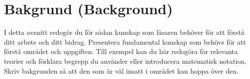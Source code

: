 \section{Bakgrund (Background)}
\label{sec:background}

I detta avsnitt redog\"{o}r du f\"{o}r s\r{a}dan kunskap som l\"{a}saren beh\"{o}ver f\"{o}r att f\"{o}rst\r{a} ditt arbete och ditt bidrag. Presentera fundamental kunskap som beh\"{o}vs f\"{o}r att f\"{o}rst\r{a} omr\r{a}det och uppgiften. Till exempel kan du h\"{a}r redog\"{o}ra f\"{o}r relevanta teorier och f\"{o}rklara begrepp du anv\"{a}nder eller introducera matematisk notation. Skriv bakgrunden s\r{a} att den som \"{a}r v\"{a}l insatt i omr\r{a}det kan hoppa \"{o}ver den. 

